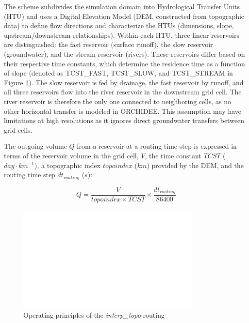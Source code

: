 The scheme subdivides the simulation domain into Hydrological Transfer Units (HTU) and uses a Digital Elevation Model (DEM, constructed from topographic data) to define flow directions and characterize the HTUs (dimensions, slope, upstream/downstream relationships).
Within each HTU, three linear reservoirs are distinguished: the fast reservoir (surface runoff), the slow reservoir (groundwater), and the stream reservoir (rivers). These reservoirs differ based on their respective time constants, which determine the residence time as a function of slope (denoted as TCST\_FAST, TCST\_SLOW, and TCST\_STREAM in Figure \ref{fig:routing_principles}).
The slow reservoir is fed by drainage, the fast reservoir by runoff, and all three reservoirs flow into the river reservoir in the downstream grid cell. The river reservoir is therefore the only one connected to neighboring cells, as no other horizontal transfer is modeled in ORCHIDEE. This assumption may have limitations at high resolutions as it ignores direct groundwater transfers between grid cells.

The outgoing volume $Q$ from a reservoir at a routing time step is expressed in terms of the reservoir volume in the grid cell, $V$, the time constant $TCST$ ($day \cdot km^{-1}$), a topographic index $topoindex$ ($km$) provided by the DEM, and the routing time step $dt_{routing}$ ($s$):

\begin{equation}
    Q = \frac{V}{topoindex \times TCST} \times \frac{dt_{routing}}{86400}
\end{equation}

\begin{figure}[h]
    \centering
    \includegraphics[width=1\linewidth]{images/routing_structure.png}
    \caption{Operating principles of the \textit{interp\_topo} routing}
    \label{fig:routing_principles}
\end{figure}

